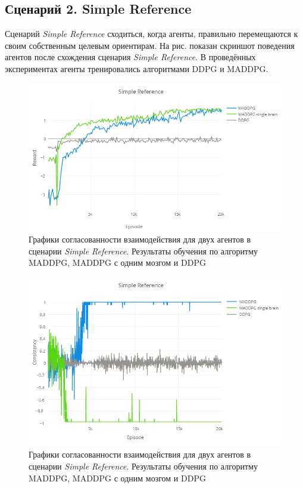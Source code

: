 \subsection{Сценарий 2. Simple Reference}

Сценарий \textit{Simple Reference} сходиться, когда агенты, правильно перемещаются к своим собственным целевым ориентирам. На рис.  показан скриншот поведения агентов после схождения сценария \textit{Simple Reference}. В проведённых экспериментах агенты тренировались алгоритмами DDPG и MADDPG.

\begin{figure}[ht!]
	\center
	\includegraphics [scale=0.6] {my_folder/images/ch5/sr-rew.png}
	\caption{Графики согласованности взаимодействия для двух агентов в сценарии \textit{Simple Reference}. Результаты обучения по алгоритму MADDPG, MADDPG с одним мозгом и DDPG}
	\label{fig:result-sr-rew}
\end{figure}

\begin{figure}[ht!]
	\center
	\includegraphics [scale=0.6] {my_folder/images/ch5/sr-comm.png}
	\caption{Графики согласованности взаимодействия для двух агентов в сценарии \textit{Simple Reference}. Результаты обучения по алгоритму MADDPG, MADDPG с одним мозгом и DDPG}
	\label{fig:result-sr-comm}
\end{figure}

